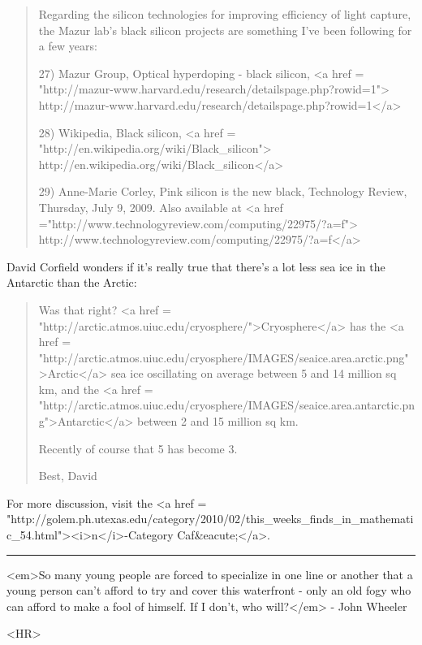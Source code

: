\begin{quote}
Regarding the silicon technologies for improving efficiency of light capture, 
the Mazur lab's black silicon projects are something I've been following for a 
few years:

27) Mazur Group, Optical hyperdoping - black silicon, 
<a href = "http://mazur-www.harvard.edu/research/detailspage.php?rowid=1">
http://mazur-www.harvard.edu/research/detailspage.php?rowid=1</a>

28) Wikipedia, Black silicon, <a href =
"http://en.wikipedia.org/wiki/Black_silicon">
http://en.wikipedia.org/wiki/Black_silicon</a>

29) Anne-Marie Corley, Pink silicon is the new black, Technology
Review, Thursday, July 9, 2009.  Also available at <a href
="http://www.technologyreview.com/computing/22975/?a=f">
http://www.technologyreview.com/computing/22975/?a=f</a>

\end{quote}
    


David Corfield wonders if it's really true that there's a
lot less sea ice in the Antarctic than the Arctic:

\begin{quote}

Was that right? <a href = "http://arctic.atmos.uiuc.edu/cryosphere/">Cryosphere</a> has the 
<a href = 
"http://arctic.atmos.uiuc.edu/cryosphere/IMAGES/seaice.area.arctic.png">Arctic</a> sea ice oscillating on average between 5 and 14 million sq km, and the
<a href = "http://arctic.atmos.uiuc.edu/cryosphere/IMAGES/seaice.area.antarctic.png">Antarctic</a> between 2 and 15 million sq km.


Recently of course that 5 has become 3.

Best, David

\end{quote}
    




For more discussion, visit the
<a href = "http://golem.ph.utexas.edu/category/2010/02/this_weeks_finds_in_mathematic_54.html"><i>n</i>-Category Caf&eacute;</a>.

\par\noindent\rule{\textwidth}{0.4pt}
<em>So many young people are forced to specialize in one line or another that 
a young person can't afford to try and cover this waterfront - only an old 
fogy who can afford to make a fool of himself.  If I don't, who will?</em> -
John Wheeler

<HR>



